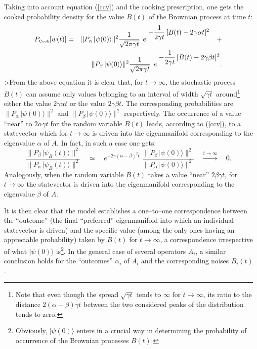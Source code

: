 \documentclass[10pt,a4paper]{article}
\begin{document}
Taking into account equation (\ref{ccv}) and the cooking
prescription, one gets the cooked probability density for the
value $B(t)$ of the Brownian process at time $t$:
\begin{eqnarray} \label{waxmi}
P_{\makebox{\tiny Cook}}[w(t)] & = & \|
P_{\alpha}\,|\psi(0)\rangle \|^{2} \frac{1}{\sqrt{2\pi\gamma t}}\,
\; e^{\displaystyle\; -\frac{1}{2\gamma t}\,
[B(t) - 2 \gamma \alpha t]^{2}} \quad + \nonumber \\
& & \| P_{\beta}\,|\psi(0)\rangle \|^{2} \frac{1}{\sqrt{2\pi\gamma
t}}\, \; e^{\displaystyle\; -\frac{1}{2\gamma t}\, [B(t) - 2
\gamma \beta t]^{2}}.
\end{eqnarray}
>From the above equation it is clear that, for $t \rightarrow
\infty$, the stochastic process $B(t)$ can assume only values
belonging to an interval of width $\sqrt{\gamma t}$
around\footnote{Note that even though the spread $\sqrt{\gamma t}$
tends to $\infty$ for $t \rightarrow \infty$, its ratio to the
distance $2(\alpha -\beta)\gamma t$ between the two considered
peaks of the distribution tends to zero.} either the value
$2\gamma \alpha t$ or the value $2\gamma \beta t$. The
corresponding probabilities are $\| P_{\alpha}\,|\psi(0)\rangle
\|^{2}$ and $\| P_{\beta}\,|\psi(0)\rangle \|^{2}$ respectively.
The occurrence of a value ``near'' to $2 \alpha\gamma t$ for the
random variable $B(t)$ leads, according to (\ref{ccv}), to a
statevector which for $t \rightarrow \infty$ is driven into the
eigenmanifold corresponding to the eigenvalue $\alpha$ of $A$. In
fact, in such a case one gets:
\begin{equation}
\frac{\| P_{\beta}\,|\psi_{B}(t)\rangle \|^{2}}{\| P_{\alpha}\,
|\psi_{B}(t)\rangle \|^{2}} \quad \simeq \quad e^{\displaystyle
-2\gamma (\alpha -\beta)^{2}t} \; \frac{\|
P_{\beta}\,|\psi(0)\rangle \|^{2}}{\| P_{\alpha}\,|\psi(0)\rangle
\|^{2}} \quad \stackrel{t \rightarrow \infty}{\longrightarrow}
\quad 0.
\end{equation}
Analogously, when the random variable $B(t)$ takes a value
``near'' $2 \beta\gamma t$, for $t \rightarrow \infty$ the
statevector is driven into the eigenmanifold corresponding to the
eigenvalue $\beta$ of $A$.

It is then clear that the model establishes a one--to--one
correspondence between the ``outcome'' (the final ``preferred''
eigenmanifold into which an individual statevector is driven) and
the specific value (among the only ones having an appreciable
probability) taken by $B(t)$ for $t \rightarrow \infty$, a
correspondence irrespective of what $|\psi(0)\rangle$
is\footnote{Obviously, $|\psi(0)\rangle$ enters in a crucial way
in determining the probability of occurrence of the Brownian
processes $B(t)$.}. In the general case of several operators
$A_{i}$, a similar conclusion holds for the ``outcomes''
$\alpha_{i}$ of $A_{i}$ and the corresponding noises $B_{i}(t)$.
\end{document}

